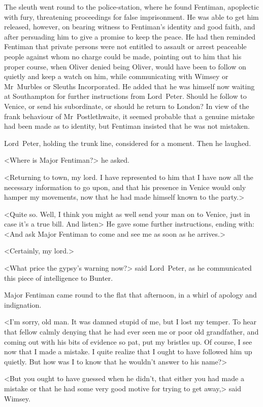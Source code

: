 The sleuth went round to the police-station, where he found Fentiman, apoplectic with fury, threatening proceedings for false imprisonment. He was able to get him released, however, on bearing witness to Fentiman's identity and good faith, and after persuading him to give a promise to keep the peace. He had then reminded Fentiman that private persons were not entitled to assault or arrest peaceable people against whom no charge could be made, pointing out to him that his proper course, when Oliver denied being Oliver, would have been to follow on quietly and keep a watch on him, while communicating with Wimsey or Mr~Murbles or Sleuths Incorporated. He added that he was himself now waiting at Southampton for further instructions from Lord~Peter. Should he follow to Venice, or send his subordinate, or should he return to London? In view of the frank behaviour of Mr~Postlethwaite, it seemed probable that a genuine mistake had been made as to identity, but Fentiman insisted that he was not mistaken.

Lord~Peter, holding the trunk line, considered for a moment. Then he laughed.

<Where is Major Fentiman?> he asked.

<Returning to town, my lord. I have represented to him that I have now all the necessary information to go upon, and that his presence in Venice would only hamper my movements, now that he had made himself known to the party.>

<Quite so. Well, I think you might as well send your man on to Venice, just in case it's a true bill. And listen\longdots> He gave some further instructions, ending with: <And ask Major Fentiman to come and see me as soon as he arrives.>

<Certainly, my lord.>

<What price the gypsy's warning now?> said Lord~Peter, as he communicated this piece of intelligence to Bunter.

Major Fentiman came round to the flat that afternoon, in a whirl of apology and indignation.

<I'm sorry, old man. It was damned stupid of me, but I lost my temper. To hear that fellow calmly denying that he had ever seen me or poor old grandfather, and coming out with his bits of evidence so pat, put my bristles up. Of course, I see now that I made a mistake. I quite realize that I ought to have followed him up quietly. But how was I to know that he wouldn't answer to his name?>

<But you ought to have guessed when he didn't, that either you had made a mistake or that he had some very good motive for trying to get away,> said Wimsey.

